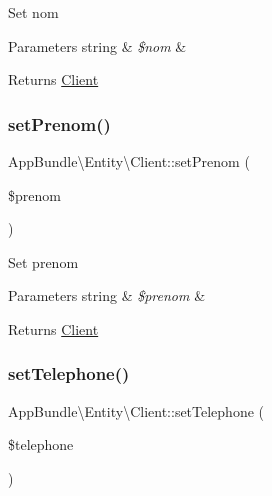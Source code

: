 Set nom


\begin{DoxyParams}[1]{Parameters}
string & {\em \$nom} & \\
\hline
\end{DoxyParams}
\begin{DoxyReturn}{Returns}
\hyperlink{class_app_bundle_1_1_entity_1_1_client}{Client} 
\end{DoxyReturn}
\mbox{\label{class_app_bundle_1_1_entity_1_1_client_aa2a558c160b6bccb977de5c13336899b}} 
\subsubsection{\texorpdfstring{set\+Prenom()}{setPrenom()}}
{\footnotesize\ttfamily App\+Bundle\textbackslash{}\+Entity\textbackslash{}\+Client\+::set\+Prenom (\begin{DoxyParamCaption}\item[{}]{\$prenom }\end{DoxyParamCaption})}

Set prenom


\begin{DoxyParams}[1]{Parameters}
string & {\em \$prenom} & \\
\hline
\end{DoxyParams}
\begin{DoxyReturn}{Returns}
\hyperlink{class_app_bundle_1_1_entity_1_1_client}{Client} 
\end{DoxyReturn}
\mbox{\label{class_app_bundle_1_1_entity_1_1_client_a7ed3d6dde97dc36572ecd115fa50523d}} 
\subsubsection{\texorpdfstring{set\+Telephone()}{setTelephone()}}
{\footnotesize\ttfamily App\+Bundle\textbackslash{}\+Entity\textbackslash{}\+Client\+::set\+Telephone (\begin{DoxyParamCaption}\item[{}]{\$telephone }\end{DoxyParamCaption})}

